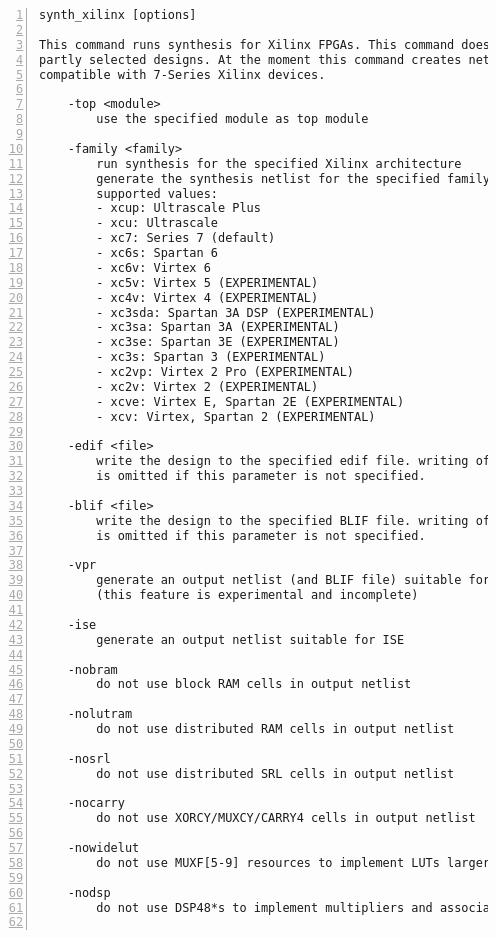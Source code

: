 \begin{lstlisting}[numbers=left,frame=single]
    synth_xilinx [options]

This command runs synthesis for Xilinx FPGAs. This command does not operate on
partly selected designs. At the moment this command creates netlists that are
compatible with 7-Series Xilinx devices.

    -top <module>
        use the specified module as top module

    -family <family>
        run synthesis for the specified Xilinx architecture
        generate the synthesis netlist for the specified family.
        supported values:
        - xcup: Ultrascale Plus
        - xcu: Ultrascale
        - xc7: Series 7 (default)
        - xc6s: Spartan 6
        - xc6v: Virtex 6
        - xc5v: Virtex 5 (EXPERIMENTAL)
        - xc4v: Virtex 4 (EXPERIMENTAL)
        - xc3sda: Spartan 3A DSP (EXPERIMENTAL)
        - xc3sa: Spartan 3A (EXPERIMENTAL)
        - xc3se: Spartan 3E (EXPERIMENTAL)
        - xc3s: Spartan 3 (EXPERIMENTAL)
        - xc2vp: Virtex 2 Pro (EXPERIMENTAL)
        - xc2v: Virtex 2 (EXPERIMENTAL)
        - xcve: Virtex E, Spartan 2E (EXPERIMENTAL)
        - xcv: Virtex, Spartan 2 (EXPERIMENTAL)

    -edif <file>
        write the design to the specified edif file. writing of an output file
        is omitted if this parameter is not specified.

    -blif <file>
        write the design to the specified BLIF file. writing of an output file
        is omitted if this parameter is not specified.

    -vpr
        generate an output netlist (and BLIF file) suitable for VPR
        (this feature is experimental and incomplete)

    -ise
        generate an output netlist suitable for ISE

    -nobram
        do not use block RAM cells in output netlist

    -nolutram
        do not use distributed RAM cells in output netlist

    -nosrl
        do not use distributed SRL cells in output netlist

    -nocarry
        do not use XORCY/MUXCY/CARRY4 cells in output netlist

    -nowidelut
        do not use MUXF[5-9] resources to implement LUTs larger than native for the target

    -nodsp
        do not use DSP48*s to implement multipliers and associated logic


\end{lstlisting}
